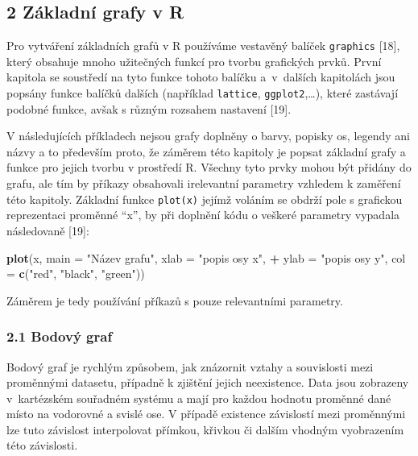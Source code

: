 \documentclass[12pt,]{article}
\newenvironment{Shaded}{\begin{snugshade}}{\end{snugshade}}
\newcommand{\KeywordTok}[1]{\textcolor[rgb]{0.13,0.29,0.53}{\textbf{#1}}}
\newcommand{\DataTypeTok}[1]{\textcolor[rgb]{0.13,0.29,0.53}{#1}}
\newcommand{\StringTok}[1]{\textcolor[rgb]{0.31,0.60,0.02}{#1}}
\newcommand{\OperatorTok}[1]{\textcolor[rgb]{0.81,0.36,0.00}{\textbf{#1}}}
\newcommand{\NormalTok}[1]{#1}
\begin{document}
\hypertarget{base}{\subsection{2 Základní grafy v R}\label{base}}

\qquad Pro vytváření základních grafů v R používáme vestavěný balíček
\texttt{graphics} {[}18{]}, který obsahuje mnoho užitečných funkcí pro
tvorbu grafických prvků. První kapitola se soustředí na tyto funkce
tohoto balíčku a~v~dalších kapitolách jsou popsány funkce balíčků
dalších (například \texttt{lattice}, \texttt{ggplot2},\ldots{}), které
zastávají podobné funkce, avšak s různým rozsahem nastavení {[}19{]}.

\qquad V následujících příkladech nejsou grafy doplněny o barvy, popisky
os, legendy ani názvy a to především proto, že záměrem této kapitoly je
popsat základní grafy a funkce pro jejich tvorbu v prostředí R. Všechny
tyto prvky mohou být přidány do grafu, ale tím by příkazy obsahovali
irelevantní parametry vzhledem k zaměření této kapitoly. Základní funkce
\texttt{plot(x)} jejímž voláním se obdrží pole s grafickou reprezentaci
proměnné \enquote{x}, by při doplnění kódu o veškeré parametry vypadala
následovaně {[}19{]}:

\begin{Shaded}
\begin{Highlighting}[]
\KeywordTok{plot}\NormalTok{(x, }\DataTypeTok{main =} \StringTok{"Název grafu"}\NormalTok{, }\DataTypeTok{xlab =} \StringTok{"popis osy x"}\NormalTok{, }
\OperatorTok{+}\StringTok{    }\DataTypeTok{ylab =} \StringTok{"popis osy y"}\NormalTok{, }\DataTypeTok{col =} \KeywordTok{c}\NormalTok{(}\StringTok{"red"}\NormalTok{, }\StringTok{"black"}\NormalTok{, }\StringTok{"green"}\NormalTok{)) }
\end{Highlighting}
\end{Shaded}

Záměrem je tedy používání příkazů s pouze relevantními parametry.

\hypertarget{scatterplot}{\subsubsection{2.1 Bodový
graf}\label{scatterplot}}

\qquad Bodový graf je rychlým způsobem, jak znázornit vztahy a
souvislosti mezi proměnnými datasetu, případně k zjištění jejich
neexistence. Data jsou zobrazeny v~kartézském souřadném systému a mají
pro každou hodnotu proměnné dané místo na vodorovné a svislé ose. V
případě existence závislostí mezi proměnnými lze tuto závislost
interpolovat přímkou, křivkou či dalším vhodným vyobrazením této
závislosti.
\end{document}
